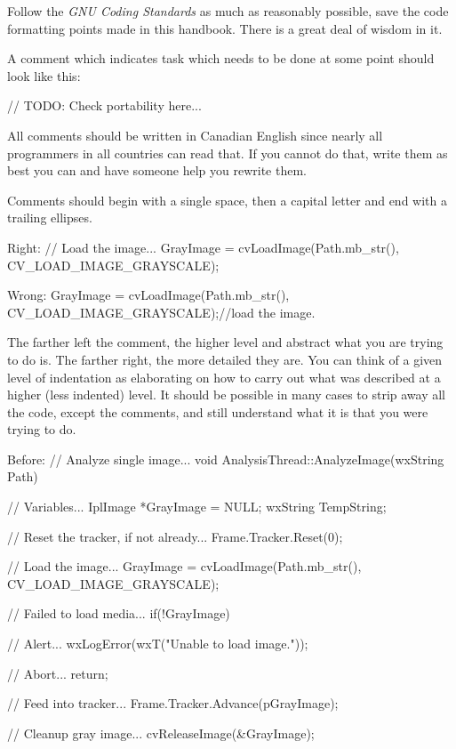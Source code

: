 \item
Follow the {\it GNU Coding Standards} as much as reasonably possible, save the code formatting points made in this handbook. There is a great deal of wisdom in it.

\item
A comment which indicates task which needs to be done at some point should look like this: 

\startCodeExample
// TODO: Check portability here...
\stopCodeExample

\stopitemize


\startitemize[4]
\item
All comments should be written in Canadian English since nearly all programmers in all countries can read that. If you cannot do that, write them as best you can and have someone help you rewrite them.

\item
Comments should begin with a single space, then a capital letter and end with a trailing ellipses. 

Right:
\startCodeExample
// Load the image...
GrayImage = cvLoadImage(Path.mb_str(), CV_LOAD_IMAGE_GRAYSCALE);
\stopCodeExample

Wrong:
\startCodeExample
GrayImage = cvLoadImage(Path.mb_str(), CV_LOAD_IMAGE_GRAYSCALE);//load the image.
\stopCodeExample

\item
The farther left the comment, the higher level and abstract what you are trying to do is. The farther right, the more detailed they are. You can think of a given level of indentation as elaborating on how to carry out what was described at a higher (less indented) level. It should be possible in many cases to strip away all the code, except the comments, and still understand what it is that you were trying to do.

Before:
\startCodeExample
// Analyze single image...
void AnalysisThread::AnalyzeImage(wxString Path)
{
    // Variables...
    IplImage   *GrayImage   = NULL;
    wxString    TempString;

    // Reset the tracker, if not already...
    Frame.Tracker.Reset(0);

    // Load the image...
    GrayImage = cvLoadImage(Path.mb_str(), CV_LOAD_IMAGE_GRAYSCALE);

        // Failed to load media...
        if(!GrayImage)
        {
            // Alert...
            wxLogError(wxT("Unable to load image."));
            
            // Abort...
            return;
        }

    // Feed into tracker...
    Frame.Tracker.Advance(pGrayImage);
    
    // Cleanup gray image...
    cvReleaseImage(&GrayImage);
}
\stopCodeExample

